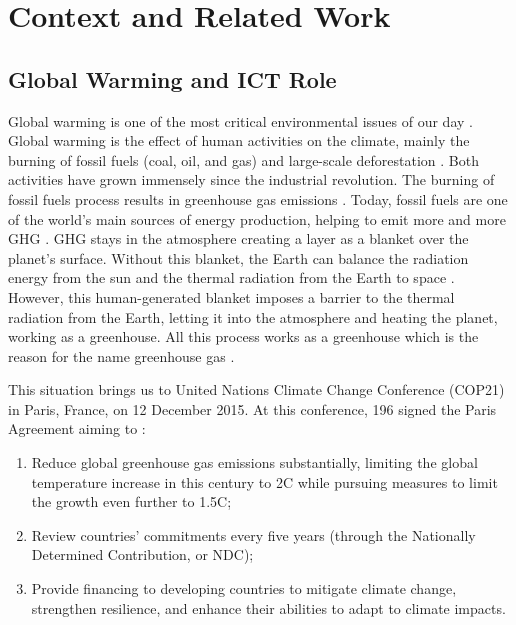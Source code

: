 \chapter{Context and Related Work}
\label{cha:related_work}
\minitoc

\section{Global Warming and ICT Role}
Global warming is one of the most critical environmental issues of our day \cite{houghton2005global}. Global warming is the effect of human activities on the climate, mainly the burning of fossil fuels (coal, oil, and gas) and large-scale deforestation \cite{houghton2005global}. Both activities have grown immensely since the industrial revolution. The burning of fossil fuels process results in greenhouse gas emissions \cite{olabi2022renewable}. Today, fossil fuels are one of the world's main sources of energy production, helping to emit more and more GHG \cite{olabi2022renewable}. GHG stays in the atmosphere creating a layer as a blanket over the planet's surface. Without this blanket, the Earth can balance the radiation energy from the sun and the thermal radiation from the Earth to space \cite{houghton2005global}. However, this human-generated blanket imposes a barrier to the thermal radiation from the Earth, letting it into the atmosphere and heating the planet, working as a greenhouse. All this process works as a greenhouse which is the reason for the name greenhouse gas \cite{houghton2005global}.

This situation brings us to United Nations Climate Change Conference (COP21) in Paris, France, on 12 December 2015. At this conference, 196 signed the Paris Agreement aiming to \cite{nations_paris_nodate}:
\begin{enumerate}
    \item Reduce global greenhouse gas emissions substantially, limiting the global temperature increase in this century to 2\degree C while pursuing measures to limit the growth even further to 1.5\degree C;
    \item Review countries’ commitments every five years (through the Nationally Determined Contribution, or NDC);
    \item Provide financing to developing countries to mitigate climate change, strengthen resilience, and enhance their abilities to adapt to climate impacts. 
\end{enumerate}

